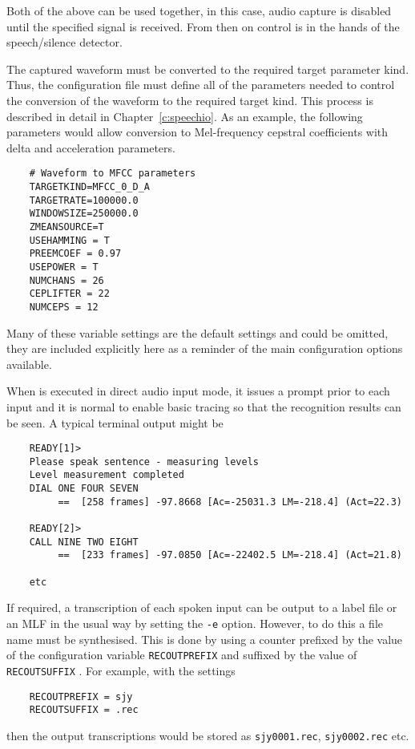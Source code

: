 Both of the above can be used together, in this case, audio capture is disabled
until the specified signal is received.  From then on control is in the hands
of the speech/silence detector.

The captured waveform must be converted to the required 
target parameter kind.  Thus, the configuration file must define
all of the parameters needed to control the
conversion of the waveform to the required target kind.
This process is described in detail in Chapter~\ref{c:speechio}.
As an example, the following parameters would allow conversion
to Mel-frequency cepstral coefficients with delta and acceleration
parameters.
\begin{verbatim}
    # Waveform to MFCC parameters
    TARGETKIND=MFCC_0_D_A
    TARGETRATE=100000.0
    WINDOWSIZE=250000.0
    ZMEANSOURCE=T
    USEHAMMING = T
    PREEMCOEF = 0.97
    USEPOWER = T
    NUMCHANS = 26
    CEPLIFTER = 22
    NUMCEPS = 12
\end{verbatim}
Many of these variable settings are the default settings
and could be omitted, they are included explicitly here as a reminder
of the main configuration options available.

When  is executed in direct audio input mode,
it issues a prompt prior to each input and it is normal to enable
basic tracing so that the recognition results can be seen.
A typical terminal output might be
\begin{verbatim}
    READY[1]>
    Please speak sentence - measuring levels
    Level measurement completed
    DIAL ONE FOUR SEVEN  
         ==  [258 frames] -97.8668 [Ac=-25031.3 LM=-218.4] (Act=22.3)

    READY[2]>
    CALL NINE TWO EIGHT  
         ==  [233 frames] -97.0850 [Ac=-22402.5 LM=-218.4] (Act=21.8)

    etc
\end{verbatim}
If required, a transcription of each spoken input can be output 
to a label file or an MLF in the usual way by setting the \texttt{-e} option.  
However, to do this
a file name must be synthesised.  This is done by using a counter
prefixed by the value of the
 configuration variable
\texttt{RECOUTPREFIX} and 
suffixed by the value of \texttt{RECOUTSUFFIX}
.
For example, with the settings
\begin{verbatim}
    RECOUTPREFIX = sjy
    RECOUTSUFFIX = .rec
\end{verbatim}
then the output transcriptions would be stored as 
\texttt{sjy0001.rec},  \texttt{sjy0002.rec} etc.


